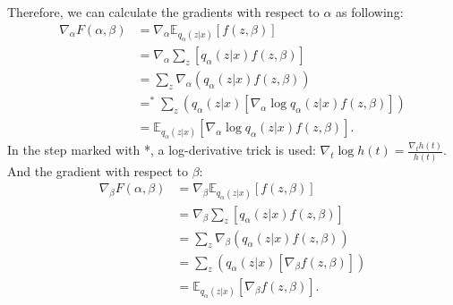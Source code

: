 \documentclass[a4paper, 12pt]{report}
\begin{document}
\noindent Therefore, we can calculate the gradients with respect to $\alpha$ as following:
\begin{align*}
    \nabla_{\alpha} F(\alpha, \beta) &= \nabla_{\alpha} \mathbb{E}_{q_{\alpha}(z|x)} [f(z, \beta)] \\
    &= \nabla_{\alpha} \sum_z [q_{\alpha}(z|x) f(z, \beta)] \\
    &= \sum_z \nabla_{\alpha} (q_{\alpha}(z|x) f(z, \beta)) \\
    &=^\ast \sum_z (q_{\alpha}(z|x) [\nabla_{\alpha} \log q_{\alpha}(z|x) f(z, \beta)]) \\
    &= \mathbb{E}_{q_{\alpha}(z|x)} [\nabla_{\alpha} \log q_{\alpha}(z|x) f(z, \beta)].
\end{align*}
In the step marked with *, a log-derivative trick is used: $\nabla_t \log h(t) = \frac{\nabla_t h(t)}{h(t)}$. \\

\noindent And the gradient with respect to $\beta$:
\begin{align*}
    \nabla_{\beta} F(\alpha, \beta) &= \nabla_{\beta} \mathbb{E}_{q_{\alpha}(z|x)}[f(z, \beta)] \\
    &= \nabla_{\beta} \sum_z [q_{\alpha}(z|x)f(z, \beta)] \\
    &= \sum_z \nabla_{\beta} (q_{\alpha}(z|x)f(z, \beta)) \\
    &= \sum_z (q_{\alpha}(z|x) [\nabla_{\beta} f(z, \beta)]) \\
    &= \mathbb{E}_{q_{\alpha}(z|x)} [\nabla_{\beta} f(z, \beta)].
\end{align*}
\end{document}
